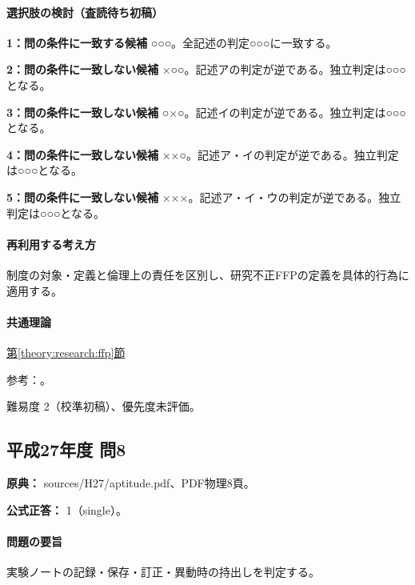 \paragraph{選択肢の検討（査読待ち初稿）}\mbox{}\par

\noindent\textbf{1：問の条件に一致する候補} ○○○。全記述の判定○○○に一致する。\par

\noindent\textbf{2：問の条件に一致しない候補} ×○○。記述アの判定が逆である。独立判定は○○○となる。\par

\noindent\textbf{3：問の条件に一致しない候補} ○×○。記述イの判定が逆である。独立判定は○○○となる。\par

\noindent\textbf{4：問の条件に一致しない候補} ××○。記述ア・イの判定が逆である。独立判定は○○○となる。\par

\noindent\textbf{5：問の条件に一致しない候補} ×××。記述ア・イ・ウの判定が逆である。独立判定は○○○となる。\par

\paragraph{再利用する考え方} 制度の対象・定義と倫理上の責任を区別し、研究不正FFPの定義を具体的行為に適用する。

\paragraph{共通理論} \hyperref[theory:research:ffp]{第\ref*{theory:research:ffp}節}

\par 参考：\cite{mext_misconduct2014}。

\par 難易度 2（校準初稿）、優先度未評価。

\subsection{平成27年度 問8}
\label{q:h27-reg-apt-08}

\noindent\textbf{原典：} sources/H27/aptitude.pdf、PDF物理8頁。

\textbf{公式正答：} 1（single）。

\paragraph{問題の要旨} 実験ノートの記録・保存・訂正・異動時の持出しを判定する。

